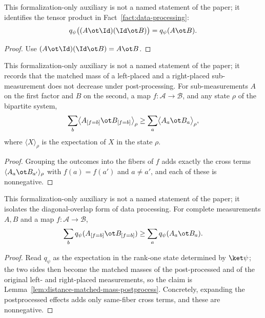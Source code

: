 \begin{lemma}
	\label{lem:distance-placed-product-qform}
	\leanok
	This formalization-only auxiliary is not a named statement of the paper; it
	identifies the tensor product in Fact~\ref{fact:data-processing}:
	\[
		q_\psi\big((A\ot\Id)(\Id\ot B)\big)=q_\psi(A\ot B).
	\]
\end{lemma}
\begin{proof}
	\leanok
	Use $(A\ot\Id)(\Id\ot B)=A\ot B$.
\end{proof}

\begin{lemma}
	\label{lem:distance-matched-mass-postprocess}
	\leanok
	This formalization-only auxiliary is not a named statement of the paper; it
	records that the matched mass of a left-placed and a right-placed
	sub-measurement does not decrease under post-processing. For
	sub-measurements $A$ on the first factor and $B$ on the second, a map
	$f\colon\mathcal A\to\mathcal B$, and any state $\rho$ of the bipartite
	system,
	\[
		\sum_b\bigl\langle A_{[f=b]}\ot B_{[f=b]}\bigr\rangle_\rho
		\geq\sum_a\bigl\langle A_a\ot B_a\bigr\rangle_\rho,
	\]
	where $\langle X\rangle_\rho$ is the expectation of $X$ in the state
	$\rho$.
\end{lemma}
\begin{proof}
	\leanok
	Grouping the outcomes into the fibers of $f$ adds exactly the cross terms
	$\langle A_a\ot B_{a'}\rangle_\rho$ with $f(a)=f(a')$ and $a\ne a'$, and
	each of these is nonnegative.
\end{proof}

\begin{lemma}
	\label{lem:distance-postprocess-overlap}
	\leanok
	This formalization-only auxiliary is not a named statement of the paper; it
	isolates the diagonal-overlap form of data processing. For complete
	measurements $A,B$ and a map $f\colon\mathcal A\to\mathcal B$,
	\[
		\sum_b q_\psi(A_{[f=b]}\ot B_{[f=b]})
		\geq\sum_a q_\psi(A_a\ot B_a).
	\]
\end{lemma}
\begin{proof}
	\leanok
	Read $q_\psi$ as the expectation in the rank-one state determined by
	$\ket\psi$; the two sides then become the matched masses of the
	post-processed and of the original left- and right-placed measurements, so
	the claim is Lemma~\ref{lem:distance-matched-mass-postprocess}. Concretely,
	expanding the postprocessed effects adds only same-fiber cross terms, and
	these are nonnegative.
\end{proof}

